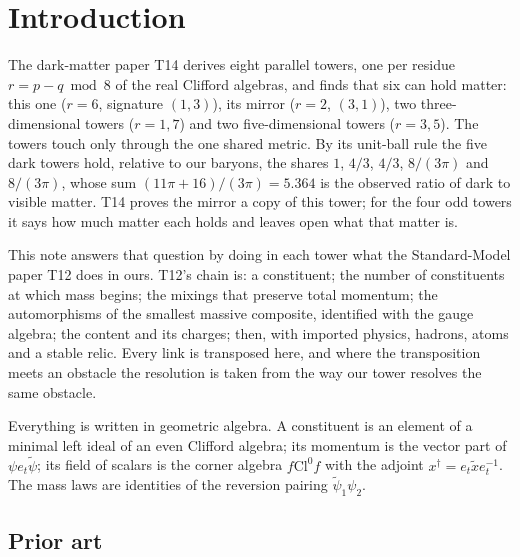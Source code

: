 \documentclass[11pt]{article}
\theoremstyle{definition}
\newcommand{\Cl}{\mathrm{Cl}}
\newcommand{\rev}[1]{\widetilde{#1}}
\begin{document}
\newpage
\tableofcontents
\newpage

\section{Introduction}\label{sec:intro}

The dark-matter paper T14 \cite{ButlerT14} derives eight parallel towers, one per residue $r = p - q \bmod 8$ of the real Clifford algebras, and finds that six can hold matter: this one ($r = 6$, signature $(1,3)$), its mirror ($r = 2$, $(3,1)$), two three-dimensional towers ($r = 1, 7$) and two five-dimensional towers ($r = 3, 5$). The towers touch only through the one shared metric. By its unit-ball rule the five dark towers hold, relative to our baryons, the shares $1$, $4/3$, $4/3$, $8/(3\pi)$ and $8/(3\pi)$, whose sum $(11\pi + 16)/(3\pi) = 5.364$ is the observed ratio of dark to visible matter. T14 proves the mirror a copy of this tower; for the four odd towers it says how much matter each holds and leaves open what that matter is.

This note answers that question by doing in each tower what the Standard-Model paper T12 \cite{ButlerT12} does in ours. T12's chain is: a constituent; the number of constituents at which mass begins; the mixings that preserve total momentum; the automorphisms of the smallest massive composite, identified with the gauge algebra; the content and its charges; then, with imported physics, hadrons, atoms and a stable relic. Every link is transposed here, and where the transposition meets an obstacle the resolution is taken from the way our tower resolves the same obstacle.

Everything is written in geometric algebra. A constituent is an element of a minimal left ideal of an even Clifford algebra; its momentum is the vector part of $\psi e_{t} \rev{\psi}$; its field of scalars is the corner algebra $f \Cl^{0} f$ with the adjoint $x^{\dagger} = e_{t}\rev{x}e_{t}^{-1}$. The mass laws are identities of the reversion pairing $\rev{\psi}_{1}\psi_{2}$.

\subsection*{Prior art}
\end{document}
